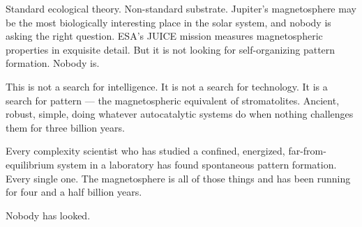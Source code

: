 Standard ecological theory. Non-standard substrate. Jupiter's magnetosphere may be the most biologically interesting place in the solar system, and nobody is asking the right question. ESA's JUICE mission measures magnetospheric properties in exquisite detail. But it is not looking for self-organizing pattern formation. Nobody is.

This is not a search for intelligence. It is not a search for technology. It is a search for pattern --- the magnetospheric equivalent of stromatolites. Ancient, robust, simple, doing whatever autocatalytic systems do when nothing challenges them for three billion years.

Every complexity scientist who has studied a confined, energized, far-from-equilibrium system in a laboratory has found spontaneous pattern formation. Every single one. The magnetosphere is all of those things and has been running for four and a half billion years.

Nobody has looked.

\chapterreturn
